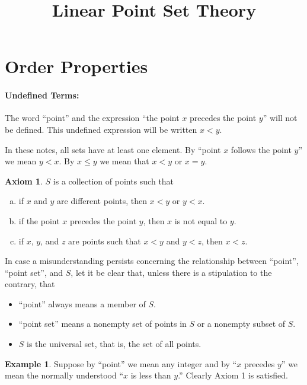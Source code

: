 \documentclass{article}
\title{\textbf{\textsf{Linear Point Set Theory}}}
\date{}
\theoremstyle{definition}
\newtheorem{axiom}{Axiom}
\theoremstyle{definition}
\newtheorem{example}{Example}
\theoremstyle{plain}
\begin{document}
\maketitle

\section*{Order Properties}

\paragraph{Undefined Terms:} The word ``point'' and the expression ``the point
$x$ precedes the point $y$'' will not be defined.  This undefined expression
will be written $x < y$.

In these notes, all sets have at least one element.  By ``point $x$ follows the
point $y$'' we mean $y < x$.  By $x \leq y$ we mean that $x < y$ or $x = y$.

\begin{axiom}
  $S$ is a collection of points such that
  \begin{enumerate}[a.]
    \item if $x$ and $y$ are different points, then $x < y$ or $y < x$.
    \item if the point $x$ precedes the point $y$, then $x$ is not equal to $y$.
    \item if $x$, $y$, and $z$ are points such that $x < y$ and $y < z$, then $x < z$.
  \end{enumerate}

\end{axiom}

In case a misunderstanding persists concerning the relationship between
``point'', ``point set'', and $S$, let it be clear that, unless there is a
stipulation to the contrary, that

\begin{itemize}
  \item ``point'' always means a member of $S$.
  \item ``point set'' means a nonempty set of points in $S$ or a nonempty subset of $S$.
  \item $S$ is the universal set, that is, the set of all points.
\end{itemize}

\begin{example}
  Suppose by ``point'' we mean any integer and by ``$x$ precedes $y$'' we mean
  the normally understood ``$x$ is less than $y$.''  Clearly Axiom 1 is
  satisfied.
\end{example}
\end{document}
